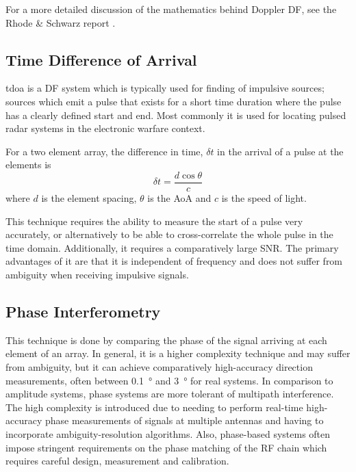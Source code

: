 For a more detailed discussion of the mathematics behind Doppler DF, see the Rhode \& Schwarz report \cite{rhode2000introtodf}. 

\subsection{Time Difference of Arrival}
\gls{tdoa} is a DF system which is typically used for finding of impulsive sources; sources which emit a pulse that exists for a short time duration where the pulse has a clearly defined start and end. Most commonly it is used for locating pulsed radar systems in the electronic warfare context.

For a two element array, the difference in time, \(\delta t\) in the arrival of a pulse at the elements is
\begin{equation}
  \delta t = \frac{d \cos \theta}{c}
\end{equation}
where \(d\) is the element spacing, \(\theta\) is the AoA and \(c\) is the speed of light.

This technique requires the ability to measure the start of a pulse very accurately, or alternatively to be able to cross-correlate the whole pulse in the time domain. Additionally, it requires a comparatively large SNR. The primary advantages of it are that it is independent of frequency and does not suffer from ambiguity when receiving impulsive signals\cite{jenkins1991smallaperture}.

\subsection{Phase Interferometry}
This technique is done by comparing the phase of the signal arriving at each element of an array.
In general, it is a higher complexity technique and may suffer from ambiguity, but it can achieve comparatively high-accuracy direction measurements, often between \SI{0.1}{\degree} and \SI{3}{\degree} for real systems\cite{center2012electronic}.
In comparison to amplitude systems, phase systems are more tolerant of multipath interference. 
The high complexity is introduced due to needing to perform real-time high-accuracy phase measurements of signals at multiple antennas and having to incorporate ambiguity-resolution algorithms.
Also, phase-based systems often impose stringent requirements on the phase matching of the RF chain which requires careful design, measurement and calibration\cite{schleher1999electronic}.

